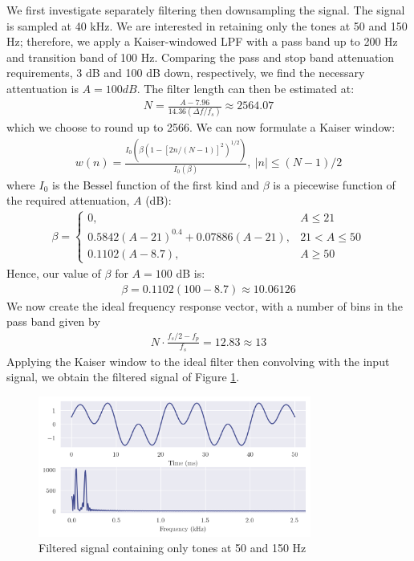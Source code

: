 We first investigate separately filtering then downsampling the signal. The signal is sampled at 40 kHz. We are interested in retaining only the tones at 50 and 150 Hz; therefore, we apply a Kaiser-windowed LPF with a pass band up to 200 Hz and transition band of 100 Hz. Comparing the pass and stop band attenuation requirements, 3 dB and 100 dB down, respectively, we find the necessary attentuation is $A=100dB$. The filter length can then be estimated at:
\begin{align}
    N = \frac{A - 7.96}{14.36(\Delta f/f_s)} \approx 2564.07
\end{align}
which we choose to round up to 2566. We can now formulate a Kaiser window:
\begin{align}
    w(n) = \frac{I_0(\beta(1 - [2n/(N-1)]^2)^{1/2})}{I_0(\beta)},\ |n| \leq (N-1)/2
\end{align}
where $I_0$ is the Bessel function of the first kind and $\beta$ is a piecewise function of the required attenuation, $A$ (dB):
\begin{align}
    \beta = \begin{cases}
        0,                                      & A \leq 21 \\
        0.5842(A - 21)^{0.4} + 0.07886(A - 21), & 21 < A \leq 50 \\
        0.1102(A - 8.7),                        & A \geq 50
    \end{cases}
\end{align}
Hence, our value of $\beta$ for $A=100$ dB is:
\begin{align}
    \beta = 0.1102(100 - 8.7) \approx 10.06126
\end{align}
We now create the ideal frequency response vector, with a number of bins in the pass band given by
\begin{align}
    N \cdot \frac{f_s/2 - f_p}{f_s} = 12.83 \approx 13
\end{align}
Applying the Kaiser window to the ideal filter then convolving with the input signal, we obtain the filtered signal of Figure \ref{fig:q1_filt}.

\begin{figure}[ht]
    \centering
    \includegraphics[width=0.8\textwidth]{images/q1_filt.png}
    \caption{Filtered signal containing only tones at 50 and 150 Hz}
    \label{fig:q1_filt}
\end{figure}

